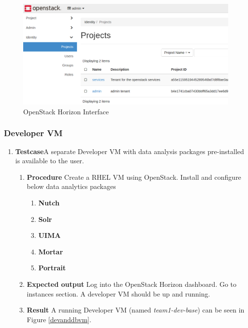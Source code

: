 \begin{enumerate}
\begin{enumerate}[label={}]
    \begin{figure}
      \centering
      \includegraphics[scale=0.33]{screenshots/openstack-horizon.png}
      \caption{OpenStack Horizon Interface}
      \label{openstack-horizon}
    \end{figure}
  \end{enumerate}
\end{enumerate}


\subsubsection{Developer VM}
\begin{enumerate}
\item \textbf{Testcase}\newline A separate Developer VM with data
  analysis packages pre-installed is available to the user.
  \begin{enumerate}[label={}]
  \item \textbf{Procedure}\newline
    Create a RHEL VM using OpenStack. Install and configure below data analytics
    packages
    \begin{enumerate}
    \item \textbf{Nutch}
    \item \textbf{Solr}
    \item \textbf{UIMA}
    \item \textbf{Mortar}
    \item \textbf{Portrait}
    \end{enumerate}
  \item \textbf{Expected output}\newline
    Log into the OpenStack Horizon dashboard. Go to instances
    section. A developer VM should be up and running.
  \item \textbf{Result}\newline
    A running Developer VM (named \emph{team1-dev-base}) can be seen in Figure \ref{devanddbvm}.
  \end{enumerate}
\end{enumerate}


